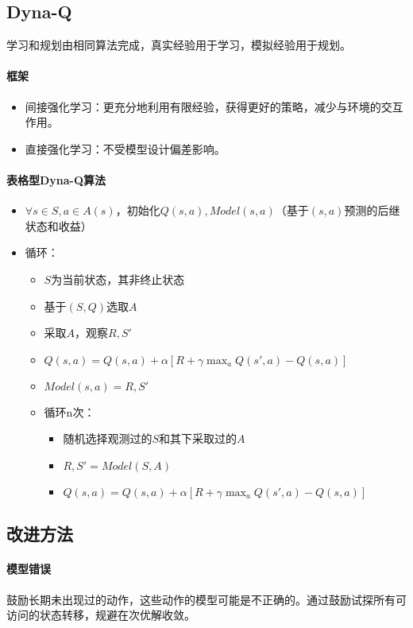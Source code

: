 \documentclass[
12pt, %
a4paper, 
oneside, %
headinclude,footinclude, %
]{scrartcl}
\begin{document}
\subsection{Dyna-Q}
学习和规划由相同算法完成，真实经验用于学习，模拟经验用于规划。
\paragraph{框架}
\begin{itemize}
\item 间接强化学习：更充分地利用有限经验，获得更好的策略，减少与环境的交互作用。
\item 直接强化学习：不受模型设计偏差影响。
\end{itemize}
\paragraph{表格型Dyna-Q算法}
\begin{itemize}
\item $ \forall s \in S, a \in A(s) $，初始化$ Q(s, a),Model(s, a) $（基于$ (s, a) $预测的后继状态和收益）
\item 循环：
\begin{itemize}
\item $ S $为当前状态，其非终止状态
\item 基于$ (S, Q) $选取$ A $
\item 采取$ A $，观察$ R,S' $
\item $ Q(s, a) = Q(s, a) + \alpha[R + \gamma \max_aQ(s', a) - Q(s, a)] $
\item $ Model(s, a) = R,S' $
\item 循环n次：
\begin{itemize}
\item 随机选择观测过的$ S $和其下采取过的$ A $
\item $ R,S' = Model(S, A) $
\item $ Q(s, a) = Q(s, a) + \alpha[R + \gamma \max_aQ(s', a) - Q(s, a)] $
\end{itemize}
\end{itemize}
\end{itemize}
\subsection{改进方法}
\paragraph{模型错误}
鼓励长期未出现过的动作，这些动作的模型可能是不正确的。通过鼓励试探所有可访问的状态转移，规避在次优解收敛。
\end{document}
